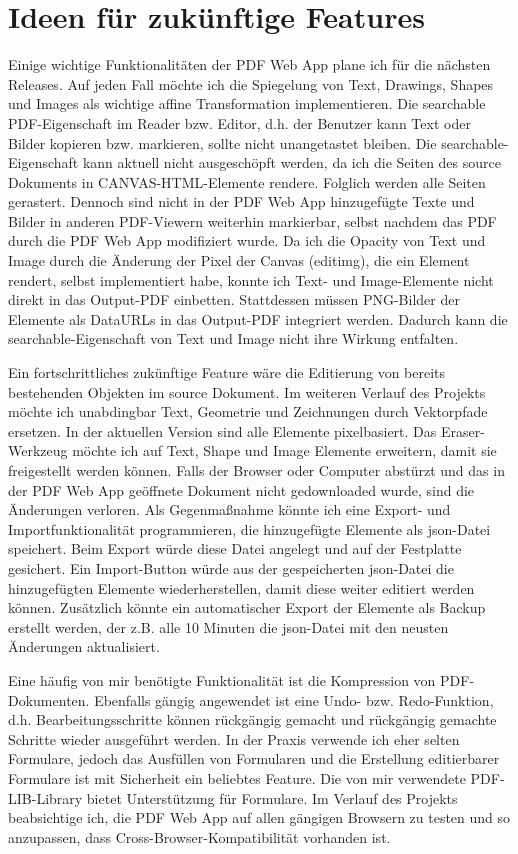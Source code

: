 \section{Ideen für zukünftige Features}
Einige wichtige Funktionalitäten der PDF Web App plane ich für die nächsten Releases. Auf jeden Fall möchte ich die Spiegelung von Text, Drawings, Shapes und Images als wichtige affine Transformation implementieren. Die searchable PDF-Eigenschaft im Reader bzw. Editor, d.h. der Benutzer kann Text oder Bilder kopieren bzw. markieren, sollte nicht unangetastet bleiben. Die searchable-Eigenschaft kann aktuell nicht ausgeschöpft werden, da ich die Seiten des source Dokuments in CANVAS-HTML-Elemente rendere. Folglich werden alle Seiten gerastert. Dennoch sind nicht in der PDF Web App hinzugefügte Texte und Bilder in anderen PDF-Viewern weiterhin markierbar, selbst nachdem das PDF durch die PDF Web App modifiziert wurde. Da ich die Opacity von Text und Image durch die Änderung der Pixel der Canvas (editimg), die ein Element rendert, selbst implementiert habe, konnte ich Text- und Image-Elemente nicht direkt in das Output-PDF einbetten. Stattdessen müssen PNG-Bilder der Elemente als DataURLs in das Output-PDF integriert werden. Dadurch kann die searchable-Eigenschaft von Text und Image nicht ihre Wirkung entfalten.
\par
Ein fortschrittliches zukünftige Feature wäre die Editierung von bereits bestehenden Objekten im source Dokument. Im weiteren Verlauf des Projekts möchte ich unabdingbar Text, Geometrie und Zeichnungen durch Vektorpfade ersetzen. In der aktuellen Version sind alle Elemente pixelbasiert. Das Eraser-Werkzeug möchte ich auf Text, Shape und Image Elemente erweitern, damit sie freigestellt werden können. Falls der Browser oder Computer abstürzt und das in der PDF Web App geöffnete Dokument nicht gedownloaded wurde, sind die Änderungen verloren. Als Gegenmaßnahme könnte ich eine Export- und Importfunktionalität programmieren, die hinzugefügte Elemente als \gls{json}-Datei speichert. Beim Export würde diese Datei angelegt und auf der Festplatte gesichert. Ein Import-Button würde aus der gespeicherten \gls{json}-Datei die hinzugefügten Elemente wiederherstellen, damit diese weiter editiert werden können. Zusätzlich könnte ein automatischer Export der Elemente als Backup erstellt werden, der z.B. alle 10 Minuten die \gls{json}-Datei mit den neusten Änderungen aktualisiert.
\par
Eine häufig von mir benötigte Funktionalität ist die Kompression von PDF-Dokumenten. Ebenfalls gängig angewendet ist eine Undo- bzw. Redo-Funktion, d.h. Bearbeitungsschritte können rückgängig gemacht und rückgängig gemachte Schritte wieder ausgeführt werden. In der Praxis verwende ich eher selten Formulare, jedoch das Ausfüllen von Formularen und die Erstellung editierbarer Formulare ist mit Sicherheit ein beliebtes Feature. Die von mir verwendete PDF-LIB-Library bietet Unterstützung für Formulare. Im Verlauf des Projekts beabsichtige ich, die PDF Web App auf allen gängigen Browsern zu testen und so anzupassen, dass Cross-Browser-Kompatibilität vorhanden ist.